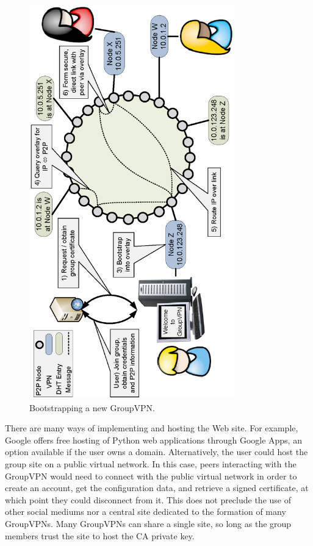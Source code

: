 \begin{figure}[ht]
\centering
\includegraphics[width=3.5in,angle=-90]{figs/groupvpn.ps}
\caption{Bootstrapping a new GroupVPN.}
\label{fig:groupvpn}
\end{figure}

There are many ways of implementing and hosting the Web site.  For example,
Google offers free hosting of Python web applications through Google Apps, an
option available if the user owns a domain.  Alternatively, the user could host
the group site on a public virtual network. In this case, peers interacting
with the GroupVPN would need to connect with the public virtual network in
order to create an account, get the configuration data, and retrieve a signed
certificate, at which point they could disconnect from it.  This does not
preclude the use of other social mediums nor a central site dedicated to the
formation of many GroupVPNs.  Many GroupVPNs can share a single site, so long
as the group members trust the site to host the CA private key.

